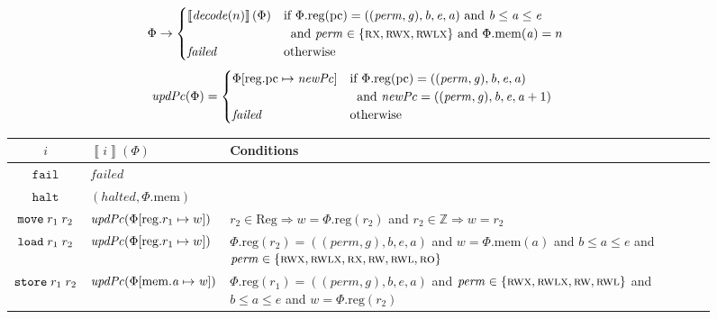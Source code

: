 \documentclass[format=acmsmall, review=false, screen=true]{acmart}
\newcommand{\update}[2]{[#1 \mapsto #2]}
\newcommand{\sem}[1]{\left\llbracket #1 \right\rrbracket}
\newcommand{\var}[1]{\mathit{#1}}
\newcommand{\gl}{\var{g}}
\newcommand{\pcreg}{\mathrm{pc}}
\newcommand{\addr}{\var{a}}
\newcommand{\start}{\var{b}}
\newcommand{\addrend}{\var{e}}
\newcommand{\perm}{\var{perm}}
\newcommand{\stdcap}[1][(\perm,\gl)]{\left(#1,\start,\addrend,\addr \right)}
\newcommand{\plainproj}[1]{\mathrm{#1}}
\newcommand{\memheap}[1][\Phi]{#1.\plainproj{mem}}
\newcommand{\memreg}[1][\Phi]{#1.\plainproj{reg}}
\newcommand{\updateHeap}[3][\Phi]{#1\update{\plainproj{mem}.#2}{#3}}
\newcommand{\updateReg}[3][\Phi]{#1\update{\plainproj{reg}.#2}{#3}}
\newcommand{\failed}{\mathit{failed}}
\newcommand{\halted}{\mathit{halted}}
\newcommand{\plainfun}[2]{
  \ifthenelse{\equal{#2}{}}
  {\mathit{#1}}
  {\mathit{#1}(#2)}
}
\newcommand{\decode}{\plainfun{decode}{}}
\newcommand{\stdUpdatePc}[1]{\plainfun{updPc}{#1}}
\newcommand{\plaindom}[1]{\mathrm{#1}}
\newcommand{\Regs}{\plaindom{Reg}}
\newcommand{\ints}{\mathbb{Z}}
\newcommand{\refreg}[1]{#1}
\newcommand{\refheap}[1]{#1}
\newcommand{\zinstr}[1]{\mathtt{#1}}
\newcommand{\fail}{\zinstr{fail}}
\newcommand{\halt}{\zinstr{halt}}
\newcommand{\twoinstr}[3]{
  \ifthenelse{\equal{#2#3}{}}
  {\zinstr{#1}}
  {\zinstr{#1} \; #2 \; #3}
}
\newcommand{\move}[2]{\twoinstr{move}{#1}{#2}}
\newcommand{\store}[2]{\twoinstr{store}{#1}{#2}}
\newcommand{\load}[2]{\twoinstr{load}{#1}{#2}}
\newcommand{\plainperm}[1]{\textsc{#1}}
\newcommand{\readonly}{\plainperm{ro}}
\newcommand{\readwrite}{\plainperm{rw}}
\newcommand{\exec}{\plainperm{rx}}
\newcommand{\rwx}{\plainperm{rwx}}
\newcommand{\readwritel}{\plainperm{rwl}}
\newcommand{\rwlx}{\plainperm{rwlx}}
\begin{document}
\begin{figure}[htb]
  \centering
  \begin{equation*}
    \Phi  \rightarrow
    \begin{cases}
      \sem{\decode(n)}(\Phi) & \arraycolsep=0pt
      \begin{array}[t]{l}
        \text{if $\memreg(\pcreg) = \stdcap$ and $\start \leq \addr \leq \addrend$}\\ 
        \text{\;\;and $\perm \in \{ \exec,\rwx, \rwlx \}$ and $\memheap(\addr) = n$ }
      \end{array}
\\
      \failed                                 & \text{otherwise}
    \end{cases}
  \end{equation*}
  \begin{align*}
    \stdUpdatePc{\Phi} &=
                         \begin{cases}
                           \updateReg{\pcreg}{\var{newPc}} & \arraycolsep=0pt
                           \begin{array}[t]{l}
                             \text{if $\memreg(\pcreg) = \stdcap$}\\
                             \text{\;\;and $\var{newPc} = ((\perm,\gl),\start,\addrend,\addr + 1)$}
                           \end{array}
\\
                             \failed & \text{otherwise}
                         \end{cases}
  \end{align*}
  \begin{tabular}{|c|p{3.4cm}|>{\raggedright\arraybackslash}p{7.3cm}|}
    \hline
    $i$&$\sem{i}(\Phi)$&Conditions\\
    \hline 
    $\fail$&$\failed$&\\
    \hline
    $\halt$&$(\halted,\memheap)$&\\
    \hline
    $\move{\refreg{r_1}}{r_2}$& $\stdUpdatePc{}(\updateReg{r_1}{w})$&$r_2 \in \Regs \Rightarrow w = \memreg(r_2)$ and $r_2 \in \ints \Rightarrow w = r_2$\\
    \hline
    $\load{\refreg{r_1}}{\refheap{r_2}}$&$\stdUpdatePc{\updateReg{r_1}{w}}$&$\memreg(r_2) = \stdcap{}$ and  $w = \memheap(\addr)$ and $\start \leq \addr \leq \addrend$ and $\perm \in \{ \rwx, \rwlx, \exec, \readwrite, \readwritel, \readonly \}$ \\
    \hline
    $\store{\refheap{r_1}}{\refreg{r_2}}$&$\stdUpdatePc{\updateHeap{\addr}{\var{w}}}$&$\memreg(r_1) = \stdcap$ and $\perm \in \{ \rwx, \rwlx, \readwrite, \readwritel\}$  and $\start \leq \addr \leq \addrend$ and $\var{w} = \memreg(r_2)$

\end{tabular}
\end{figure}
\end{document}
